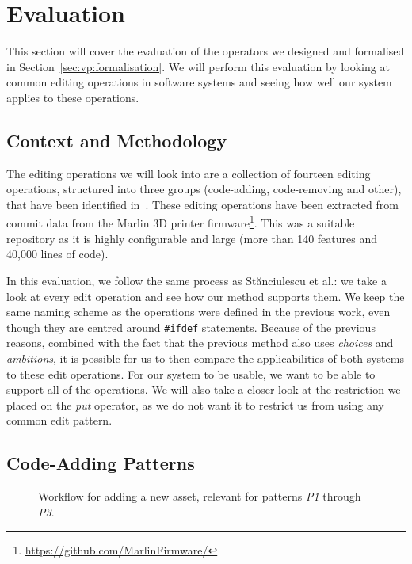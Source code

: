 \chapter{Evaluation}\label{sec:evaluation}
This section will cover the evaluation of the operators we designed and
formalised in Section~\ref{sec:vp:formalisation}. We will perform this
evaluation by looking at common editing operations in software systems and
seeing how well our system applies to these operations.

\section{Context and Methodology}
The editing operations we will look into are a collection of fourteen editing
operations, structured into three groups (code-adding, code-removing and other), 
that have been identified in~\cite{stuanciulescu2016}. These editing operations
have been extracted from commit data from the Marlin 3D printer firmware\footnote{\url{https://github.com/MarlinFirmware/}}.
This was a suitable repository as it is highly configurable and large (more than 140
features and 40,000 lines of code). 

In this evaluation, we follow the same process as St{\u{a}}nciulescu et al.: we
take a look at every edit operation and see how our method supports them. We keep
the same naming scheme as the operations were defined in the previous work, even
though they are centred around \texttt{\#ifdef} statements. Because of the previous
reasons, combined with the fact that the previous method also uses \emph{choices}
and \emph{ambitions}, it is possible for us to then compare the applicabilities 
of both systems to these edit operations. For our system to be usable, we
want to be able to support all of the operations. We will also take a closer look 
at the restriction we placed on the \emph{put} operator, as we do not want it to
restrict us from using any common edit pattern.
\clearpage
\section{Code-Adding Patterns}
\begin{figure}
  \centering
  \caption{Workflow for adding a new asset, relevant for patterns \emph{P1} through \emph{P3}.}
  \label{fig:patterns:p1}
\end{figure}
